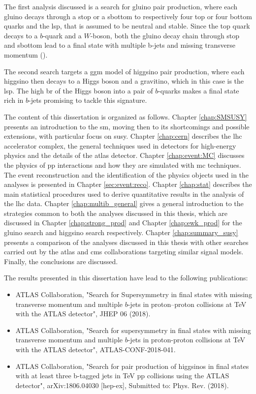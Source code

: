 The first analysis discussed is a search for gluino pair production, where each gluino decays through a stop or a sbottom 
to respectively four top or four bottom quarks and the \gls{lsp}, that is assumed to be neutral and stable.
Since the top quark decays to a $b$-quark and a $W$-boson, both the gluino decay chain through stop and sbottom lead to a 
final state with multiple b-jets and missing transverse momentum (\met). 

The second search targets a \gls{ggm} model of higgsino pair production, where each higgsino then decays to a Higgs boson and 
a gravitino, which in this case is the \gls{lsp}. The high \gls{br} of the Higgs boson into a pair of $b$-quarks makes a final state 
rich in $b$-jets promising to tackle this signature.

The content of this dissertation is organized as follows. Chapter \ref{chap:SMSUSY} presents an introduction to the \gls{sm}, 
moving then to its shortcomings and possible extensions, with particular focus on \gls{susy}. 
Chapter \ref{chap:cern} describes the \gls{lhc} accelerator complex, the general techniques used in detectors 
for high-energy physics and the details of the \gls{atlas} detector. 
Chapter \ref{chap:event:MC} discusses the physics of \gls{pp} interactions and how they are simulated with \gls{mc} techniques. 
The event reconstruction and the identification of the physics objects used in the analyses is presented in Chapter \ref{sec:event:reco}. 
Chapter \ref{chap:stat} describes the main statistical procedures used to derive quantitative results in the analysis of the \gls{lhc} data.
Chapter \ref{chap:multib_general} gives a general introduction to the strategies common to both the analyses discussed in this thesis, 
which are discussed in Chapter \ref{chap:strong_prod} and Chapter \ref{chap:ewk_prod} for the gluino search and 
higgsino search respectively. 
Chapter \ref{chap:summary_susy} presents a comparison of the analyses discussed in this thesis with other searches carried out 
by the \gls{atlas} and \gls{cms} collaborations targeting similar signal models. 
Finally, the conclusions are discussed. 

The results presented in this dissertation have lead to the following publications:

\begin{itemize}
\item  ATLAS Collaboration, "Search for Supersymmetry in final states with missing transverse momentum and multiple $b$-jets in proton–proton collisions at \cmtre TeV with the ATLAS detector", JHEP 06 (2018). 
\item  ATLAS Collaboration, "Search for supersymmetry in final states with missing transverse momentum and multiple $b$-jets in proton-proton collisions at \cmtre TeV with the ATLAS detector", ATLAS-CONF-2018-041.
\item  ATLAS Collaboration, "Search for pair production of higgsinos in final states with at least three b-tagged jets in \cmtre TeV pp collisions using the ATLAS detector",  
arXiv:1806.04030 [hep-ex], 
Submitted to: Phys. Rev. (2018).
\end{itemize}

